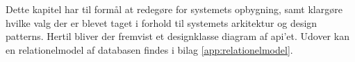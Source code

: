 Dette kapitel har til formål at redegøre for systemets opbygning, samt klargøre hvilke valg 
der er blevet taget i forhold til systemets arkitektur og design patterns. Hertil bliver der fremvist et 
designklasse diagram af api'et. Udover kan en relationelmodel af databasen findes i bilag \ref{app:relationelmodel}.